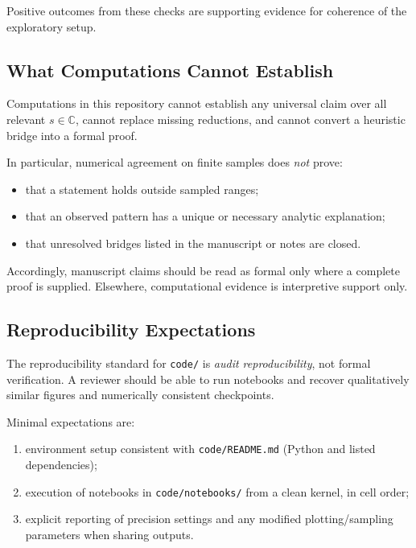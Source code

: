 Positive outcomes from these checks are supporting evidence for coherence of the exploratory setup.

\subsection{What Computations Cannot Establish}

Computations in this repository cannot establish any universal claim over all relevant $s \in \mathbb{C}$, cannot replace missing reductions, and cannot convert a heuristic bridge into a formal proof.

In particular, numerical agreement on finite samples does \emph{not} prove:

\begin{itemize}
  \item that a statement holds outside sampled ranges;
  \item that an observed pattern has a unique or necessary analytic explanation;
  \item that unresolved bridges listed in the manuscript or notes are closed.
\end{itemize}

Accordingly, manuscript claims should be read as formal only where a complete proof is supplied. Elsewhere, computational evidence is interpretive support only.

\subsection{Reproducibility Expectations}

The reproducibility standard for \texttt{code/} is \emph{audit reproducibility}, not formal verification. A reviewer should be able to run notebooks and recover qualitatively similar figures and numerically consistent checkpoints.

Minimal expectations are:

\begin{enumerate}
  \item environment setup consistent with \texttt{code/README.md} (Python and listed dependencies);
  \item execution of notebooks in \texttt{code/notebooks/} from a clean kernel, in cell order;
  \item explicit reporting of precision settings and any modified plotting/sampling parameters when sharing outputs.
\end{enumerate}

